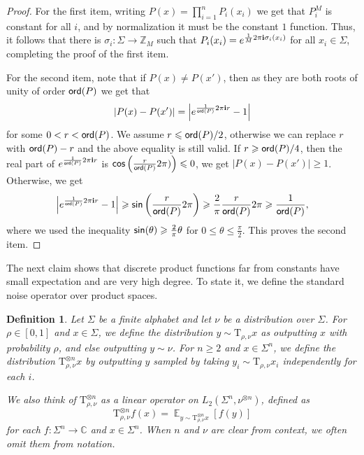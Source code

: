 \documentclass[10pt,a4paper]{amsart}
\newtheorem{definition}[thm]{Definition}
\newcommand\card[1]{\left| {#1} \right|}
\newcommand\Expect[2]{{\mathop{\mathbb{E}}_{#1}\left[ {#2} \right]}}
\renewcommand\geq{\geqslant}
\renewcommand\leq{\leqslant}
\begin{document}
\begin{proof}
    For the first item, writing $P(x) = \prod\limits_{i=1}^{n}P_i(x_i)$ we get that $P_i^{M}$ is constant for all $i$, and by normalization it must be the constant $1$ function. Thus, it follows that there is $\sigma_i\colon \Sigma\to\mathbb{Z}_{M}$ such that 
    $P_i(x_i) = e^{\frac{1}{M}2\pi{\bf i}\sigma_i(x_i)}$ for all $x_i\in \Sigma$, completing the proof of the first item.

    For the second item, note that if $P(x)\neq P(x')$, then as they are both roots of unity of order ${\sf ord}(P)$ we get that
    \[
    \card{P(x)-P(x')}
    = 
    \card{e^{\frac{1}{{\sf ord}(P)}2\pi{\bf i}r}-1}
    \]
    for some $0<r<{\sf ord}(P)$.
    We assume $r\leq {\sf ord}(P)/2$, otherwise we can replace $r$ with ${\sf ord}(P)-r$ and the above equality is still valid. 
    If $r\geq {\sf ord}(P)/4$, then the real part of $e^{\frac{1}{{\sf ord}(P)}2\pi{\bf i}r}$ is 
    ${\sf cos}\left(\frac{r}{{\sf ord}(P)}2\pi)\right)\leq 0$, we get $\card{P(x)-P(x')}\geq 1$. Otherwise, we get
    \[
    \card{e^{\frac{1}{{\sf ord}(P)}2\pi{\bf i}r}-1}
    \geq {\sf sin}\left(\frac{r}{{\sf ord}(P)}2\pi\right)
    \geq \frac{2}{\pi} \frac{r}{{\sf ord}(P)}2\pi
    \geq \frac{1}{{\sf ord}(P)},
    \]
    where we used the inequality ${\sf sin}(\theta)\geq \frac{2}{\pi}\theta$ for $0\leq \theta\leq \frac{\pi}{2}$. This proves the second item.
\end{proof}
The next claim shows that discrete product functions far from constants have small expectation and are very high degree. To state it, we define the standard noise operator over product spaces.
\begin{definition}\label{def:noise_op}
    Let $\Sigma$ be a finite alphabet and let $\nu$ be a distribution over $\Sigma$. For $\rho\in [0,1]$ and $x\in \Sigma$, we define the distribution $y\sim\mathrm{T}_{\rho,\nu}x$ as outputting $x$ with probability $\rho$, and else outputting $y\sim \nu$. For $n\geq 2$ and $x\in\Sigma^n$, we define the distribution $\mathrm{T}_{\rho,\nu}^{\otimes n}x$ by outputting $y$ sampled by taking $y_i\sim \mathrm{T}_{\rho,\nu} x_i$ independently for each $i$.

    We also think of $\mathrm{T}_{\rho,\nu}^{\otimes n}$ as a linear operator on $L_2(\Sigma^n, \nu^{\otimes n})$, defined as
    \[
    \mathrm{T}_{\rho,\nu}^{\otimes n} f(x)
    =\Expect{y\sim \mathrm{T}_{\rho,\nu}^{\otimes n}x}{f(y)}
    \]
    for each $f\colon \Sigma^n\to\mathbb{C}$ and $x\in\Sigma^n$. When $n$ and $\nu$ are clear from context, we often omit them from notation.
\end{definition}
\end{document}
